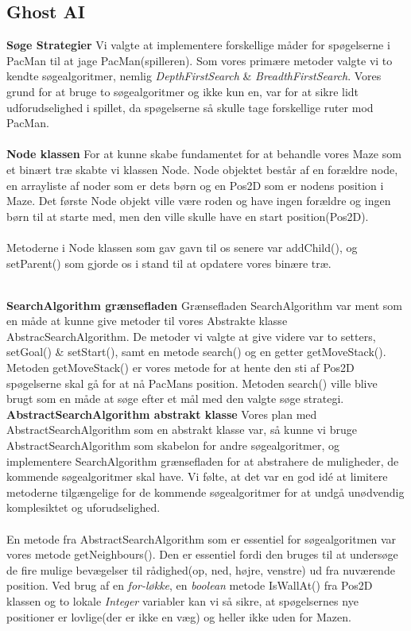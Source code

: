 \documentclass{article}
\theoremstyle{mytheoremstyle}
\theoremstyle{mytheoremstyle}
\theoremstyle{myproblemstyle}
\begin{document}
\subsection{Ghost AI}\label{sub:Ghost AI} %
\textbf{Søge Strategier}
Vi valgte at implementere forskellige måder for spøgelserne i PacMan til at jage PacMan(spilleren). 
Som vores primære metoder valgte vi to kendte søgealgoritmer, nemlig \textit{DepthFirstSearch} \& \textit{BreadthFirstSearch}. 
Vores grund for at bruge to søgealgoritmer og ikke kun en, var for at sikre lidt udforudselighed i spillet, 
da spøgelserne så skulle tage forskellige ruter mod PacMan.\\ 
\\
\textbf{Node klassen}
For at kunne skabe fundamentet for at behandle vores Maze som et binært træ skabte vi klassen Node. 
Node objektet består af en forældre node, en arrayliste af noder som er dets børn og en Pos2D som er nodens position i Maze. 
Det første Node objekt ville være roden og have ingen forældre og ingen børn til at starte med, 
men den ville skulle have en start position(Pos2D).\\ 
\\
Metoderne i Node klassen som gav gavn til os senere var addChild(), og setParent() som gjorde os i stand til at opdatere vores binære træ. 

\\
\textbf{SearchAlgorithm grænsefladen} 
Grænsefladen SearchAlgorithm var ment som en måde at kunne give metoder til vores Abstrakte klasse AbstracSearchAlgorithm. 
De metoder vi valgte at give videre var to setters, setGoal() \& setStart(), samt en metode search() og en getter getMoveStack(). 
Metoden getMoveStack() er vores metode for at hente den sti af Pos2D spøgelserne skal gå for at nå PacMans position. 
Metoden search() ville blive brugt som en måde at søge efter et mål med den valgte søge strategi. 
\\

\textbf{AbstractSearchAlgorithm abstrakt klasse}
Vores plan med AbstractSearchAlgorithm som en abstrakt klasse var, så kunne vi bruge AbstractSearchAlgorithm som skabelon for andre søgealgoritmer, og implementere SearchAlgorithm grænsefladen for at abstrahere de muligheder, de kommende søgealgoritmer skal have. Vi følte, at det var en god idé at limitere metoderne tilgængelige for de kommende søgealgoritmer for at undgå unødvendig komplesiktet og uforudselighed.\\ 
\\
En metode fra AbstractSearchAlgorithm som er essentiel for søgealgoritmen var vores metode getNeighbours(). Den er essentiel fordi den bruges til at undersøge de fire mulige bevægelser til rådighed(op, ned, højre, venstre) ud fra nuværende position. Ved brug af en \textit{for-løkke}, en \textit{boolean} metode IsWallAt() fra Pos2D klassen og to lokale \textit{Integer} variabler kan vi så sikre, at spøgelsernes nye positioner er lovlige(der er ikke en væg) og heller ikke uden for Mazen.
\\
\end{document}
